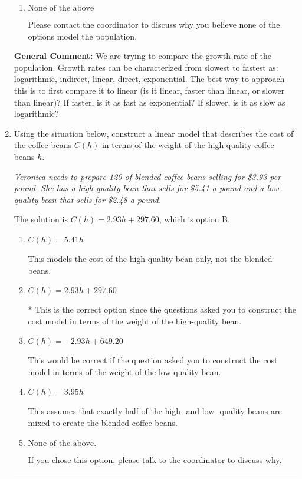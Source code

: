 \documentclass{extbook}[14pt]
\newcommand{\litem}[1]{\item #1

\rule{\textwidth}{0.4pt}}
\begin{document}
\begin{enumerate}
{\begin{enumerate}[label=\Alph*.]
This suggests a growth faster than constant but slower than exponential.
\item \( \text{None of the above} \)

Please contact the coordinator to discuss why you believe none of the options model the population.
\end{enumerate}

\textbf{General Comment:} We are trying to compare the growth rate of the population. Growth rates can be characterized from slowest to fastest as: logarithmic, indirect, linear, direct, exponential. The best way to approach this is to first compare it to linear (is it linear, faster than linear, or slower than linear)? If faster, is it as fast as exponential? If slower, is it as slow as logarithmic?
}
\litem{
Using the situation below, construct a linear model that describes the cost of the coffee beans $C(h)$ in terms of the weight of the high-quality coffee beans $h$.

\begin{center}
    \textit{ Veronica needs to prepare 120 of blended coffee beans selling for \$3.93 per pound. She has a high-quality bean that sells for \$5.41 a pound and a low-quality bean that sells for \$2.48 a pound. }
\end{center}
The solution is \( C(h) = 2.93 h + 297.60 \), which is option B.\begin{enumerate}[label=\Alph*.]
\item \( C(h) = 5.41 h \)

This models the cost of the high-quality bean only, not the blended beans.
\item \( C(h) = 2.93 h + 297.60 \)

* This is the correct option since the questions asked you to construct the cost model in terms of the weight of the high-quality bean.
\item \( C(h) = -2.93 h + 649.20 \)

This would be correct if the question asked you to construct the cost model in terms of the weight of the low-quality bean.
\item \( C(h) = 3.95 h \)

This assumes that exactly half of the high- and low- quality beans are mixed to create the blended coffee beans.
\item \( \text{None of the above.} \)

If you chose this option, please talk to the coordinator to discuss why.
\end{enumerate}

}
\end{enumerate}
\end{document}
